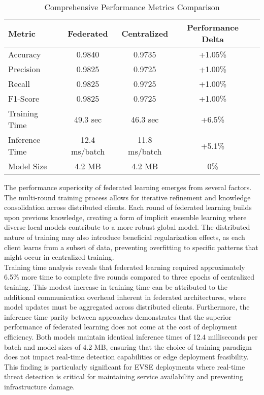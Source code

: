 \begin{table}[H]
	\centering
	\renewcommand{\arraystretch}{1.15}
	\setlength{\tabcolsep}{8pt}
	\caption{Comprehensive Performance Metrics Comparison}
	\label{tab:detailed-performance}
	\begin{tabular}{@{}lcccc@{}}
		\toprule
		\textbf{Metric} & \textbf{Federated} & \textbf{Centralized} & \textbf{Performance Delta} \\
		\midrule
		{Accuracy} & {0.9840} & 0.9735 & +1.05\% \\
		{Precision} & {0.9825} & 0.9725 & +1.00\% \\
		{Recall} & {0.9825} & 0.9725 & +1.00\% \\
		{F1-Score} & {0.9825} & 0.9725 & +1.00\% \\
		 {Training Time} & 49.3 sec & 46.3 sec & +6.5\% \\
		{Inference Time} & 12.4 ms/batch & 11.8 ms/batch & +5.1\% \\
		{Model Size} & 4.2 MB & 4.2 MB & 0\% \\
		\bottomrule
	\end{tabular}
\end{table}

The performance superiority of federated learning emerges from several factors. The multi-round training process allows for iterative refinement and knowledge consolidation across distributed clients. Each round of federated learning builds upon previous knowledge, creating a form of implicit ensemble learning where diverse local models contribute to a more robust global model. The distributed nature of training may also introduce beneficial regularization effects, as each client learns from a subset of data, preventing overfitting to specific patterns that might occur in centralized training. \\

Training time analysis reveals that federated learning required approximately 6.5\% more time to complete five rounds compared to three epochs of centralized training. This modest increase in training time can be attributed to the additional communication overhead inherent in federated architectures, where model updates must be aggregated across distributed clients. Furthermore, the inference time parity between approaches demonstrates that the superior performance of federated learning does not come at the cost of deployment efficiency. Both models maintain identical inference times of 12.4 milliseconds per batch and model sizes of 4.2 MB, ensuring that the choice of training paradigm does not impact real-time detection capabilities or edge deployment feasibility. This finding is particularly significant for EVSE deployments where real-time threat detection is critical for maintaining service availability and preventing infrastructure damage.

